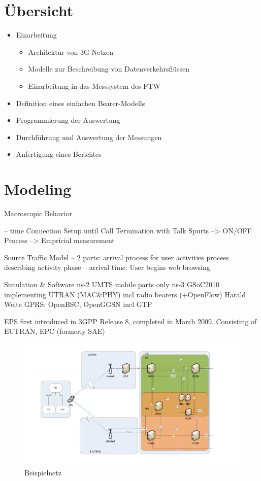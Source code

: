 %
%
\section{Übersicht}

\begin{itemize}
\item Einarbeitung
	\begin{itemize}
		\item Architektur von 3G-Netzen
		\item Modelle zur Beschreibung von Datenverkehrsflüssen
		\item Einarbeitung in das Messsystem des FTW
	\end{itemize}
\item Definition eines einfachen Bearer-Modells
\item Programmierung der Auswertung
\item Durchführung und Auswertung der Messungen
\item Anfertigung eines Berichtes
\end{itemize}

\section{Modeling}
Macroscopic Behavior

	-- time Connection Setup until Call Termination with Talk Spurts
	--> ON/OFF Process
	--> Empricial measurement
	
Source Traffic Model
	-- 2 parts: 
		arrival process for user activities
		process describing activity phase
	-- arrival time:
		User begins web browsing
	
Simulation \& Software
	ns-2 UMTS mobile parts only
	ns-3 GSoC2010 implementing \ac{UTRAN} (MAC\&PHY) incl radio bearers (+OpenFlow)
	Harald Welte GPRS: OpenBSC, OpenGGSN incl GTP
	

EPS first introduced in 3GPP Release 8, completed in March 2009. Consisting of EUTRAN, EPC (formerly SAE)


	


\begin{figure}[htbp]
 \centering
 \includegraphics[width=1.0\textwidth]{images/3gpp/eps_ps-overview.pdf}
 \caption{Beispielnetz}\label{fig:netzwerk2}
\end{figure}

